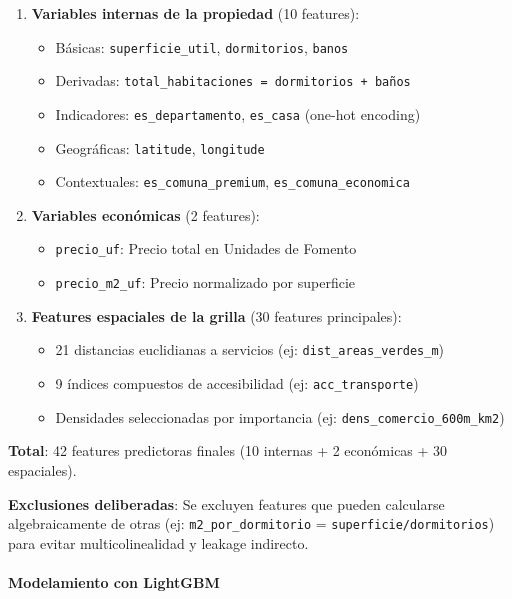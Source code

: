 \begin{enumerate}
    \item \textbf{Variables internas de la propiedad} (10 features):
    \begin{itemize}
        \item Básicas: \texttt{superficie\_util}, \texttt{dormitorios}, \texttt{banos}
        \item Derivadas: \texttt{total\_habitaciones = dormitorios + baños}
        \item Indicadores: \texttt{es\_departamento}, \texttt{es\_casa} (one-hot encoding)
        \item Geográficas: \texttt{latitude}, \texttt{longitude}
        \item Contextuales: \texttt{es\_comuna\_premium}, \texttt{es\_comuna\_economica}
    \end{itemize}
    
    \item \textbf{Variables económicas} (2 features):
    \begin{itemize}
        \item \texttt{precio\_uf}: Precio total en Unidades de Fomento
        \item \texttt{precio\_m2\_uf}: Precio normalizado por superficie
    \end{itemize}
    
    \item \textbf{Features espaciales de la grilla} (30 features principales):
    \begin{itemize}
        \item 21 distancias euclidianas a servicios (ej: \texttt{dist\_areas\_verdes\_m})
        \item 9 índices compuestos de accesibilidad (ej: \texttt{acc\_transporte})
        \item Densidades seleccionadas por importancia (ej: \texttt{dens\_comercio\_600m\_km2})
    \end{itemize}
\end{enumerate}

\textbf{Total}: 42 features predictoras finales (10 internas + 2 económicas + 30 espaciales).

\textbf{Exclusiones deliberadas}: Se excluyen features que pueden calcularse algebraicamente de otras (ej: \texttt{m2\_por\_dormitorio} = \texttt{superficie/dormitorios}) para evitar multicolinealidad y leakage indirecto.

\paragraph{Modelamiento con LightGBM}

